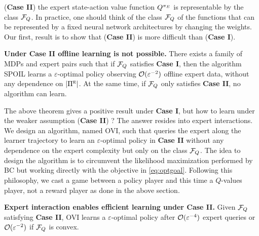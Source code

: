\documentclass{article}
\begin{document}
(\textbf{Case II}) the expert state-action value function $Q^{{\pi_E}}$ is representable by the class ${\mathcal{F}_Q}$.
In practice, one should think of the class ${\mathcal{F}_Q}$ of the functions that can be represented by a fixed neural network architectures by changing the weights.
Our first, result is to show that (\textbf{Case II}) is more difficult than (\textbf{Case I}).
\begin{tcolorbox}[
    colback=orange!10!white,
    colframe=orange!80!black,
    width=\linewidth
  ]
\begin{theorem} \textbf{Under Case II offline learning is not possible.}
There exists a family of MDPs and expert pairs such that if ${\mathcal{F}_Q}$ satisfies \textbf{Case I},
then the algorithm SPOIL  learns a $\varepsilon$-optimal policy observing $\mathcal{O}(\varepsilon^{-2})$ offline expert data, without any dependence on $\left |{{\Pi^{\scriptscriptstyle\textup{E}}}}\right |$.    
At the same time, if ${\mathcal{F}_Q}$ only satisfies \textbf{Case II}, no algorithm can learn.
\end{theorem}
\end{tcolorbox}
The above theorem gives a positive result under \textbf{Case I}, but how to learn under the weaker assumption (\textbf{Case II}) ?
The answer resides into expert interactions. We design an algorithm, named OVI, such that 
queries the expert along the learner trajectory to learn an $\varepsilon$-optimal policy in \textbf{Case II} without any dependence
on the expert complexity but only on the class ${\mathcal{F}_Q}$. 
The idea to design the algorithm is to circumvent the likelihood maximization performed by BC but working directly with the objective in \eqref{eq:optgoal}. Following this philosophy, 
we cast a game between a policy player and this time a $Q$-values player, not a reward player as done in the above section.
\begin{tcolorbox}[
    colback=orange!10!white,
    colframe=orange!80!black,
    width=\linewidth
  ]
\begin{theorem} \textbf{Expert interaction enables efficient learning under Case II.}
Given ${\mathcal{F}_Q}$ satisfying \textbf{Case II}, OVI learns a $\varepsilon$-optimal policy after $\mathcal{O}(\varepsilon^{-4})$ expert 
queries or $\mathcal{O}(\varepsilon^{-2})$ if ${\mathcal{F}_Q}$ is convex.
\end{theorem}
\end{tcolorbox}
\end{document}

